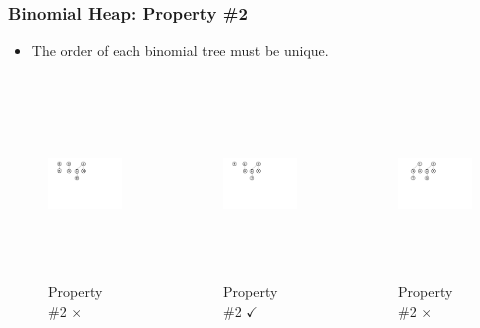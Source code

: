\documentclass[13pt]{beamer}
\begin{document}
\begin{frame}
\frametitle{Binomial Heap: Property \#2}
  \begin{itemize}
    \item The order of each binomial tree must be unique.
  \end{itemize}

  \begin{columns}[T] %
    \begin{column}[T]{4.3cm} %
      \begin{figure}
        \caption{Property \#2 $\times$}
        \includegraphics[height=5cm]{./img/struct4.png}
      \end{figure}
      \centering
    \end{column}
    \begin{column}[T]{4.3cm} %
      \begin{figure}
        \caption{Property \#2 $\checkmark$}
        \includegraphics[height=5cm]{./img/struct2.png}
      \end{figure}
    \end{column}
    \begin{column}[T]{4.3cm} %
      \begin{figure}
        \caption{Property \#2 $\times$}
        \includegraphics[height=5cm]{./img/struct1.png}
      \end{figure}
    \end{column}
  \end{columns}


\end{frame}
\end{document}
